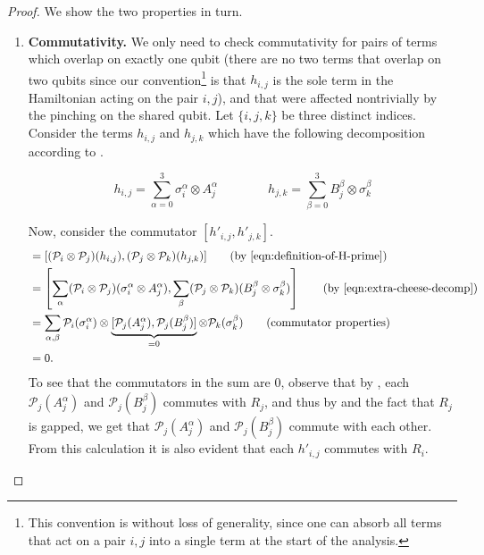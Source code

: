 \documentclass[a4paper,onecolumn,11pt]{quantumarticle}
\theoremstyle{plain}
\renewcommand{\cP}{\mathcal{P}}
\begin{document}
\begin{proof}

We show the two properties in turn.
\begin{enumerate}
    \item \textbf{Commutativity.} We only need to check commutativity for pairs of terms which overlap on exactly one qubit (there are no two terms that overlap on two qubits since our convention\footnote{This convention is without loss of generality, since one can absorb all terms that act on a pair $i,j$ into a single term at the start of the analysis.} is that $h_{i,j}$ is the sole term in the Hamiltonian acting on the pair $i,j$), and that were affected nontrivially by the pinching on the shared qubit. Let $\{i, j, k\}$ be three distinct indices. Consider the terms $h_{i,j}$ and $h_{j,k}$ which have the following decomposition according to .

    \begin{equation}\label{eqn:extra-cheese-decomp}
        h_{i,j} = \sum\limits_{\alpha = 0}^3 \sigma^\alpha_i \otimes A_j^\alpha \quad\quad\quad\quad h_{j,k} = \sum\limits_{\beta = 0}^3 B_j^\beta \otimes \sigma^\beta_k
    \end{equation}
    
Now, consider the commutator $[h'_{i,j}, h'_{j,k}]$.
\begin{align*}
    [h'_{i,j}, h'_{j,k}] &= [ (\cP_i \otimes \cP_j)(h_{i,j}), (\cP_j \otimes \cP_k)(h_{j,k}) ]  \qquad \text{(by \Cref{eqn:definition-of-H-prime})}\\
    &= \left[ \sum_{\alpha} (\cP_i \otimes \cP_j)(\sigma^\alpha_i \otimes A_j^\alpha), \sum_{\beta} (\cP_j \otimes \cP_k)(B_j^\beta \otimes \sigma^\beta_k) \right ]  \qquad \text{(by \Cref{eqn:extra-cheese-decomp})}\\
    &= \sum_{\alpha,\beta} \cP_i(\sigma_i^\alpha) \otimes \underbrace{[\cP_j(A^\alpha_j), \cP_j(B^\beta_j)]}_{=0} \otimes \cP_k(\sigma_k^\beta) \qquad \text{(commutator properties)}\\
    &= 0.
\end{align*}
To see that the commutators in the sum are $0$, observe that by , each $\cP_j(A_j^\alpha)$ and $\cP_j(B_j^\beta)$ commutes with $R_j$, and thus by  and the fact that $R_j$ is gapped, we get that $\cP_j(A_j^\alpha)$ and $\cP_j(B_j^\beta)$ commute with each other. From this calculation it is also evident that each $h'_{i,j}$ commutes with $R_i$. 


\end{enumerate}
\end{proof}
\end{document}
